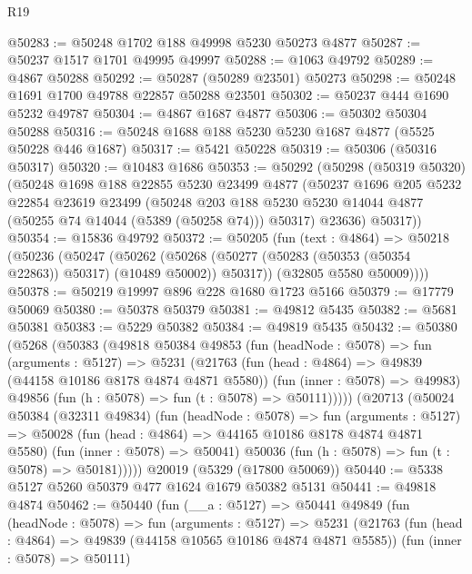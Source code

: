 \begin{lexlean}{R19}
\begin{coremodule}
@50283 := @50248 @1702 @188 @49998 @5230 @50273 @4877
@50287 := @50237 @1517 @1701 @49995 @49997
@50288 := @1063 @49792
@50289 := @4867 @50288
@50292 := @50287 (@50289 @23501) @50273
@50298 := @50248 @1691 @1700 @49788 @22857 @50288 @23501
@50302 := @50237 @444 @1690 @5232 @49787
@50304 := @4867 @1687 @4877
@50306 := @50302 @50304 @50288
@50316 := @50248 @1688 @188 @5230 @5230 @1687 @4877 (@5525 @50228 @446 @1687)
@50317 := @5421 @50228
@50319 := @50306 (@50316 @50317)
@50320 := @10483 @1686
@50353 := @50292
    (@50298
      (@50319 @50320)
      (@50248
        @1698
        @188
        @22855
        @5230
        @23499
        @4877
        (@50237
          @1696
          @205
          @5232
          @22854
          @23619
          @23499
          (@50248
            @203
            @188
            @5230
            @5230
            @14044
            @4877
            (@50255 @74 @14044 (@5389 (@50258 @74)))
            @50317)
          @23636)
        @50317))
@50354 := @15836 @49792
@50372 := @50205
    (fun (text : @4864) =>
    @50218
      (@50236
        (@50247
          (@50262 (@50268 (@50277 (@50283 (@50353 (@50354 @22863)) @50317) (@10489 @50002)) @50317))
          (@32805 @5580 @50009))))
@50378 := @50219 @19997 @896 @228 @1680 @1723 @5166
@50379 := @17779 @50069
@50380 := @50378 @50379
@50381 := @49812 @5435
@50382 := @5681 @50381
@50383 := @5229 @50382
@50384 := @49819 @5435
@50432 := @50380
    (@5268
      (@50383
        (@49818
          @50384
          @49853
          (fun (headNode : @5078) =>
          fun (arguments : @5127) =>
          @5231
            (@21763
              (fun (head : @4864) => @49839 (@44158 @10186 @8178 @4874 @4871 @5580))
              (fun (inner : @5078) => @49983)
              @49856
              (fun (h : @5078) => fun (t : @5078) => @50111)))))
      (@20713
        (@50024
          @50384
          (@32311 @49834)
          (fun (headNode : @5078) =>
          fun (arguments : @5127) =>
          @50028
            (fun (head : @4864) => @44165 @10186 @8178 @4874 @4871 @5580)
            (fun (inner : @5078) => @50041)
            @50036
            (fun (h : @5078) => fun (t : @5078) => @50181)))))
    @20019
    (@5329 (@17800 @50069))
@50440 := @5338 @5127 @5260 @50379 @477 @1624 @1679 @50382 @5131
@50441 := @49818 @4874
@50462 := @50440
    (fun (__a : @5127) =>
    @50441
      @49849
      (fun (headNode : @5078) =>
      fun (arguments : @5127) =>
      @5231
        (@21763
          (fun (head : @4864) => @49839 (@44158 @10565 @10186 @4874 @4871 @5585))
          (fun (inner : @5078) => @50111)

\end{coremodule}
\end{lexlean}
